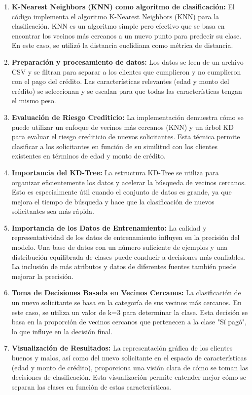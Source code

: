 \documentclass{article}
\begin{document}
\begin{sloppypar}
\begin{enumerate}
    \item \textbf{K-Nearest Neighbors (KNN) como algoritmo de clasificación:} El código implementa el algoritmo K-Nearest Neighbors (KNN) para la clasificación. KNN es un algoritmo simple pero efectivo que se basa en encontrar los vecinos más cercanos a un nuevo punto para predecir su clase. En este caso, se utilizó la distancia euclidiana como métrica de distancia.
    \item \textbf{Preparación y procesamiento de datos:} Los datos se leen de un archivo CSV y se filtran para separar a los clientes que cumplieron y no cumplieron con el pago del crédito. Las características relevantes (edad y monto del crédito) se seleccionan y se escalan para que todas las características tengan el mismo peso.
    \item \textbf{Evaluación de Riesgo Crediticio:} La implementación demuestra cómo se puede utilizar un enfoque de vecinos más cercanos (KNN) y un árbol KD para evaluar el riesgo crediticio de nuevos solicitantes. Esta técnica permite clasificar a los solicitantes en función de su similitud con los clientes existentes en términos de edad y monto de crédito.
    \item \textbf{Importancia del KD-Tree: }La estructura KD-Tree se utiliza para organizar eficientemente los datos y acelerar la búsqueda de vecinos cercanos. Esto es especialmente útil cuando el conjunto de datos es grande, ya que mejora el tiempo de búsqueda y hace que la clasificación de nuevos solicitantes sea más rápida.
    \item \textbf{Importancia de los Datos de Entrenamiento:} La calidad y representatividad de los datos de entrenamiento influyen en la precisión del modelo. Una base de datos con un número suficiente de ejemplos y una distribución equilibrada de clases puede conducir a decisiones más confiables. La inclusión de más atributos y datos de diferentes fuentes también puede mejorar la precisión.
    \item \textbf{Toma de Decisiones Basada en Vecinos Cercanos:} La clasificación de un nuevo solicitante se basa en la categoría de sus vecinos más cercanos. En este caso, se utiliza un valor de k=3 para determinar la clase. Esta decisión se basa en la proporción de vecinos cercanos que pertenecen a la clase "Sí pagó", lo que influye en la decisión final.
    \item \textbf{Visualización de Resultados: }La representación gráfica de los clientes buenos y malos, así como del nuevo solicitante en el espacio de características (edad y monto de crédito), proporciona una visión clara de cómo se toman las decisiones de clasificación. Esta visualización permite entender mejor cómo se separan las clases en función de estas características.


\end{enumerate}
\end{sloppypar}
\end{document}
